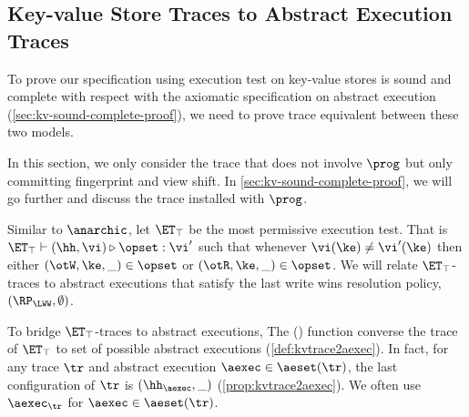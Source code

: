 \subsection{Key-value Store Traces to Abstract Execution Traces}
\label{sec:kvtrace2aexec}

To prove our specification using execution test on key-value stores 
is sound and complete with respect with the axiomatic specification on abstract execution (\cref{sec:kv-sound-complete-proof}),
we need to prove trace equivalent between these two models.

In this section, we only consider the trace that does not involve \( \prog \) but only committing fingerprint and view shift.
In \cref{sec:kv-sound-complete-proof}, we will go further and discuss the trace installed with \( \prog \).

Similar to \(\anarchic\), let $\ET_\top$ be the most permissive execution test.
That is $\ET_\top \vdash (\hh, \vi) \triangleright \opset: \vi'$ 
such that whenever $\vi(\ke) \neq \vi'(\ke)$ then either $(\otW, \ke, \_) \in \opset$ or $(\otR, \ke, \_) \in \opset$.
We will relate $\ET_{\top}$-traces to abstract executions that satisfy the last write wins resolution policy, \ie \( (\RP_\LWW, \emptyset) \).

To bridge $\ET_{\top}$-traces to abstract executions, 
The \aeset(\tr) function converse the trace of \( \ET_\top \) to set of possible abstract executions (\cref{def:kvtrace2aexec}).
In fact, for any trace \( \tr \) and abstract execution $\aexec \in \aeset(\tr)$, 
the last configuration of $\tr$ is $(\hh_{\aexec}, \_)$ (\cref{prop:kvtrace2aexec}).
We often use \( \aexec_\tr \) for \( \aexec \in \aeset(\tr) \).

